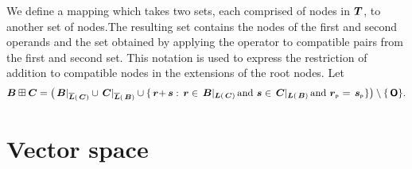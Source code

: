 {%
}%

\begin{definition}[Notation]
  We define a mapping which takes two sets, each comprised of nodes in
  $\DOM$, to another set of nodes.The resulting set contains the nodes
  of the first and second operands and the set obtained by applying
  the operator to compatible pairs from the first and second set. This
  notation is used to express the restriction of addition to
  compatible nodes in the extensions of the root nodes.  Let
  \begin{align*}
      \set{B}\stplus\set{C} = \extnO{B}{C}{r}{s}{+}.
  \end{align*}
\end{definition}



\section{Vector space}

